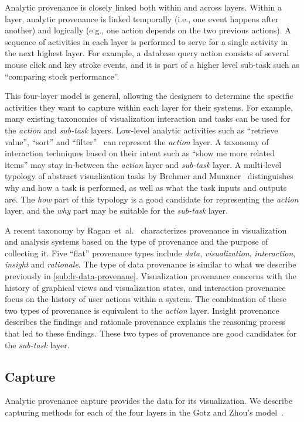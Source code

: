 Analytic provenance is closely linked both within and across layers. Within a layer, analytic provenance is linked temporally (i.e., one event happens after another) and logically (e.g., one action depends on the two previous actions). A sequence of activities in each layer is performed to serve for a single activity in the next highest layer. For example, a database query action consists of several mouse click and key stroke events, and it is part of a higher level sub-task such as ``comparing stock performance''.

This four-layer model is general, allowing the designers to determine the specific activities they want to capture within each layer for their systems. For example, many existing taxonomies of visualization interaction and tasks can be used for the \emph{action} and \emph{sub-task} layers. Low-level analytic activities such as ``retrieve value'', ``sort'' and ``filter''~\cite{Amar2005, Gotz2009} can represent the \emph{action} layer. A taxonomy of interaction techniques based on their intent such as ``show me more related items'' may stay in-between the \emph{action} layer and \emph{sub-task} layer. A multi-level typology of abstract visualization tasks by Brehmer and Munzner~\cite{Brehmer2013} distinguishes why and how a task is performed, as well as what the task inputs and outputs are. The \emph{how} part of this typology is a good candidate for representing the \emph{action} layer, and the \emph{why} part may be suitable for the \emph{sub-task} layer.

A recent taxonomy by Ragan~et~al.~\cite{Ragan2016} characterizes provenance in visualization and analysis systems based on the type of provenance and the purpose of collecting it. Five ``flat'' provenance types include \emph{data}, \emph{visualization}, \emph{interaction}, \emph{insight} and \emph{rationale}. The type of data provenance is similar to what we describe previously in \autoref{sub:lr-data-provenane}. Visualization provenance concerns with the history of graphical views and visualization states, and interaction provenance focus on the history of user actions within a system. The combination of these two types of provenance is equivalent to the \emph{action} layer. Insight provenance describes the findings and rationale provenance explains the reasoning process that led to these findings. These two types of provenance are good candidates for the \emph{sub-task} layer.

\subsection{Capture}
Analytic provenance capture provides the data for its visualization. We describe capturing methods for each of the four layers in the Gotz and Zhou's model~\cite{Gotz2009}.

